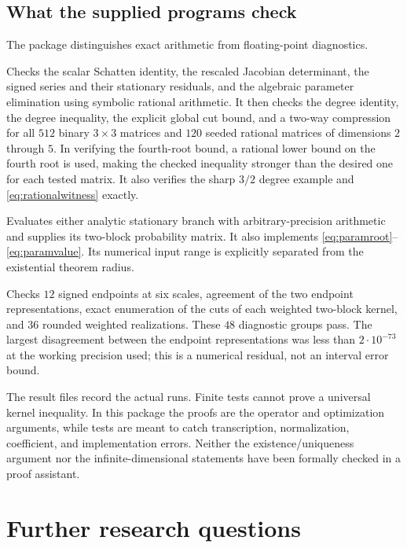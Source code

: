 \documentclass[11pt]{article}
\theoremstyle{definition}
\newcommand{\1}{\mathbf 1}
\begin{document}
\subsection{What the supplied programs check}
The package distinguishes exact arithmetic from floating-point diagnostics.
\begin{description}[leftmargin=1.2em,style=nextline,labelindent=0pt]
\item[\texttt{code/verify\_exact.py}]
Checks the scalar Schatten identity, the rescaled Jacobian determinant, the signed series and their stationary residuals, and the algebraic parameter elimination using symbolic rational arithmetic. It then checks the degree identity, the degree inequality, the explicit global cut bound, and a two-way compression for all $512$ binary $3\times3$ matrices and $120$ seeded rational matrices of dimensions $2$ through $5$. In verifying the fourth-root bound, a rational lower bound on the fourth root is used, making the checked inequality stronger than the desired one for each tested matrix. It also verifies the sharp $3/2$ degree example and \eqref{eq:rationalwitness} exactly.
\item[\texttt{code/endpoint.py}]
Evaluates either analytic stationary branch with arbitrary-precision arithmetic and supplies its two-block probability matrix. It also implements \eqref{eq:paramroot}--\eqref{eq:paramvalue}. Its numerical input range is explicitly separated from the existential theorem radius.
\item[\texttt{code/diagnostics.py}]
Checks $12$ signed endpoints at six scales, agreement of the two endpoint representations, exact enumeration of the cuts of each weighted two-block kernel, and $36$ rounded weighted realizations. These $48$ diagnostic groups pass. The largest disagreement between the endpoint representations was less than $2\cdot10^{-73}$ at the working precision used; this is a numerical residual, not an interval error bound.
\end{description}

The result files record the actual runs. Finite tests cannot prove a universal kernel inequality. In this package the proofs are the operator and optimization arguments, while tests are meant to catch transcription, normalization, coefficient, and implementation errors. Neither the existence/uniqueness argument nor the infinite-dimensional statements have been formally checked in a proof assistant.

\section{Further research questions}\label{sec:future}
\end{document}
